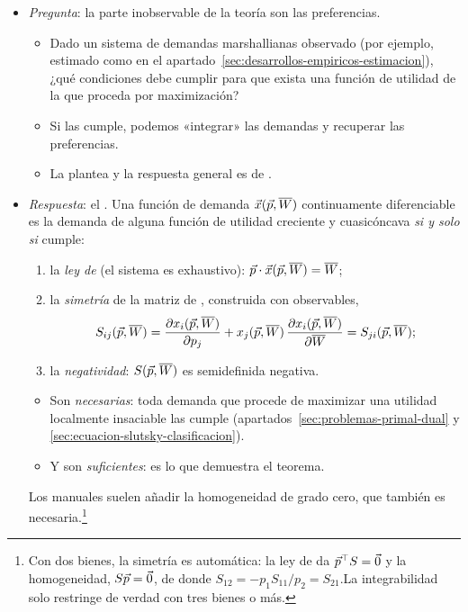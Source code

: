 \documentclass[11pt]{article}
\begin{document}
\begin{itemize}
\item \emph{Pregunta}: la parte inobservable de la teoría son las preferencias.
  \begin{itemize}
  \item Dado un sistema de demandas marshallianas observado (por ejemplo, estimado como en el apartado~\ref{sec:desarrollos-empiricos-estimacion}), ¿qué condiciones debe cumplir para que exista una función de utilidad de la que proceda por maximización?
  \item Si las cumple, podemos «integrar» las demandas y recuperar las preferencias.
  \item La plantea \textcite{Antonelli1886Teoria} y la respuesta general es de \textcite{HurwiczUzawa1971Integrability}.
  \end{itemize}

\item \emph{Respuesta}: el \nocite{MasColellWhinstonGreen1995,JehleReny2011Advanced}. Una función de demanda $\vec{x}(\vec{p},\overline{W})$ continuamente diferenciable es la demanda de alguna función de utilidad creciente y cuasicóncava \emph{si y solo si} cumple:
  \begin{enumerate}
  \item la \emph{ley de } (el sistema es exhaustivo): $\vec{p}\cdot\vec{x}(\vec{p},\overline{W})=\overline{W}$;
  \item la \emph{simetría} de la matriz de , construida con observables,
    \begin{equation}
    S_{ij}(\vec{p},\overline{W})=\frac{\partial x_i(\vec{p},\overline{W})}{\partial p_j}+x_j(\vec{p},\overline{W})\,\frac{\partial x_i(\vec{p},\overline{W})}{\partial\overline{W}}=S_{ji}(\vec{p},\overline{W}); \label{eq:slutsky-observable}
    \end{equation}
  \item la \emph{negatividad}: $S(\vec{p},\overline{W})$ es semidefinida negativa.
  \end{enumerate}
  \begin{itemize}
  \item Son \emph{necesarias}: toda demanda que procede de maximizar una utilidad localmente insaciable las cumple (apartados~\ref{sec:problemas-primal-dual} y \ref{sec:ecuacion-slutsky-clasificacion}).
  \item Y son \emph{suficientes}: es lo que demuestra el teorema.
  \end{itemize}
  Los manuales suelen añadir la homogeneidad de grado cero, que también es necesaria\nocite{MasColellWhinstonGreen1995}.\footnote{Con dos bienes, la simetría es automática: la ley de  da $\vec{p}^{\top}S=\vec{0}$ y la homogeneidad, $S\vec{p}=\vec{0}$, de donde $S_{12}=-p_1S_{11}/p_2=S_{21}$.\findemo La integrabilidad solo restringe de verdad con tres bienes o más.}


\end{itemize}
\end{document}
